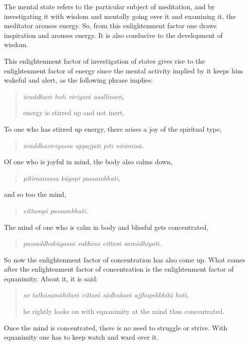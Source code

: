 The mental state refers to the particular subject of meditation, and by investigating it with wisdom and mentally going over it and examining it, the meditator arouses energy. So, from this enlightenment factor one draws inspiration and arouses energy. It is also conducive to the development of wisdom.

This enlightenment factor of investigation of states gives rise to the enlightenment factor of energy since the mental activity implied by it keeps him wakeful and alert, as the following phrase implies:

\begin{quote}
\emph{āraddhaṁ hoti viriyaṁ asallīnaṁ},

energy is stirred up and not inert.
\end{quote}

To one who has stirred up energy, there arises a joy of the spiritual type,

\begin{quote}
\emph{āraddhaviriyassa uppajjati pīti nirāmisā.}
\end{quote}

Of one who is joyful in mind, the body also calms down,

\begin{quote}
\emph{pītimanassa kāyopi passambhati,}
\end{quote}

and so too the mind,

\begin{quote}
\emph{cittampi passambhati.}
\end{quote}

The mind of one who is calm in body and blissful gets concentrated,

\begin{quote}
\emph{passaddhakāyassa sukhino cittaṁ samādhiyati.}
\end{quote}

So now the enlightenment factor of concentration has also come up. What comes after the enlightenment factor of concentration is the enlightenment factor of equanimity. About it, it is said:

\begin{quote}
\emph{so tathāsamāhitaṁ cittaṁ sādhukaṁ ajjhupekkhitā hoti,}

he rightly looks on with equanimity at the mind thus concentrated.
\end{quote}

Once the mind is concentrated, there is no need to struggle or strive. With equanimity one has to keep watch and ward over it.

